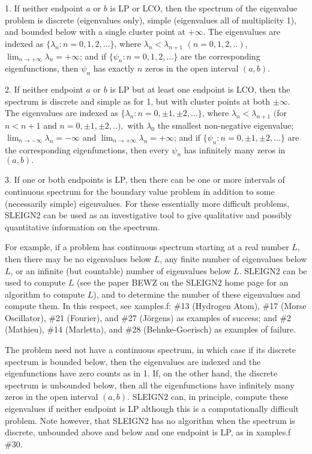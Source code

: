 \documentclass[12pt]{amsart}%
\theoremstyle{plain}
\numberwithin{equation}{section}
\numberwithin{theorem}{section}
\begin{document}
1. If neither endpoint $a$ or $b$ is LP or LCO, then the spectrum of the
eigenvalue problem is discrete (eigenvalues only), simple (eigenvalues all of
multiplicity 1), and bounded below with a single cluster point at $+\infty.$
The eigenvalues are indexed as $\{\lambda_{n}:n=0,1,2,...\}$, where
$\lambda_{n}<\lambda_{n+1}$ $(n=0,1,2,..)$, $\lim_{n\rightarrow+\infty}%
\lambda_{n}=+\infty$; and if $\{\psi_{n}:n=0,1,2,...\}$ are the corresponding
eigenfunctions, then $\psi_{n}$ has exactly $n$ zeros in the open interval $(a,b).$

2. If neither endpoint $a$ or $b$ is LP but at least one endpoint is LCO, then
the spectrum is discrete and simple as for 1, but with cluster points at both
$\pm\infty.$ The eigenvalues are indexed as $\{\lambda_{n}:n=0,\pm
1,\pm2,...\}$, where $\lambda_{n}<\lambda_{n+1}$ $($for $n<n+1$ and
$n=0,\pm1,\pm2,..),$ with $\lambda_{0}$ the smallest non-negative eigenvalue;
$\lim_{n\rightarrow-\infty}\lambda_{n}=-\infty$ and $\lim_{n\rightarrow
+\infty}\lambda_{n}=+\infty$; and if $\{\psi_{n}:n=0,\pm1,\pm2,...\}$ are the
corresponding eigenfunctions, then every $\psi_{n}$ has infinitely many zeros
in $(a,b).$

3. If one or both endpoints is LP, then there can be one or more intervals of
continuous spectrum for the boundary value problem in addition to some
(necessarily simple) eigenvalues. For these essentially more difficult
problems, SLEIGN2 can be used as an investigative tool to give qualitative and
possibly quantitative information on the spectrum.

For example, if a problem has continuous spectrum starting at a real number
$L$, then there may be no eigenvalues below $L$, any finite number of
eigenvalues below $L$, or an infinite (but countable) number of eigenvalues
below $L.$ SLEIGN2 can be used to compute $L$ (see the paper BEWZ on the
SLEIGN2 home page for an algorithm to compute $L$), and to determine the
number of these eigenvalues and compute them. In this respect, see xamples.f:
\#13 (Hydrogen Atom), \#17 (Morse Oscillator), \#21 (Fourier), and \#27
(J\"{o}rgens) as examples of success; and \#2 (Mathieu), \#14 (Marletta), and
\#28 (Behnke-Goerisch) as examples of failure.

The problem need not have a continuous spectrum, in which case if its discrete
spectrum is bounded below, then the eigenvalues are indexed and the
eigenfunctions have zero counts as in 1. If, on the other hand, the discrete
spectrum is unbounded below, then all the eigenfunctions have infinitely many
zeros in the open interval $(a,b)$. SLEIGN2 can, in principle, compute these
eigenvalues if neither endpoint is LP although this is a computationally
difficult problem. Note however, that SLEIGN2 has no algorithm when the
spectrum is discrete, unbounded above and below and one endpoint is LP, as in
xamples.f \#30.
\end{document}
